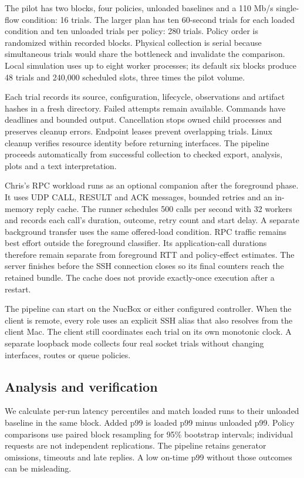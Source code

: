 The pilot has two blocks, four policies, unloaded baselines and a 110 Mb/s
single-flow condition: 16 trials. The larger plan has ten 60-second trials
for each loaded condition and ten unloaded trials per policy: 280 trials.
Policy order is randomized within recorded blocks. Physical collection is
serial because simultaneous trials would share the bottleneck and invalidate
the comparison. Local simulation uses up to eight worker processes; its
default six blocks produce 48 trials and 240,000 scheduled slots, three times
the pilot volume.

Each trial records its source, configuration, lifecycle, observations and
artifact hashes in a fresh directory. Failed attempts remain available.
Commands have deadlines and bounded output. Cancellation stops owned child
processes and preserves cleanup errors. Endpoint leases prevent overlapping
trials. Linux cleanup verifies resource identity before returning interfaces.
The pipeline proceeds automatically from successful collection to checked
export, analysis, plots and a text interpretation.

Chris's RPC workload runs as an optional companion after the foreground phase.
It uses UDP CALL, RESULT and ACK messages, bounded retries and an in-memory
reply cache. The runner schedules 500 calls per second with 32 workers and
records each call's duration, outcome, retry count and start delay. A separate
background transfer uses the same offered-load condition. RPC traffic remains
best effort outside the foreground classifier. Its application-call durations
therefore remain separate from foreground RTT and policy-effect estimates.
The server finishes before the SSH connection closes so its final counters
reach the retained bundle. The cache does not provide exactly-once execution
after a restart.

The pipeline can start on the NucBox or either configured controller. When
the client is remote, every role uses an explicit SSH alias that also resolves
from the client Mac. The client still coordinates each trial on its own
monotonic clock. A separate loopback mode collects four real socket trials
without changing interfaces, routes or queue policies.

\subsection{Analysis and verification}
We calculate per-run latency percentiles and match loaded runs to their
unloaded baseline in the same block. Added p99 is loaded p99 minus unloaded
p99. Policy comparisons use paired block resampling for 95\% bootstrap
intervals; individual requests are not independent replications. The pipeline
retains generator omissions, timeouts and late replies. A low on-time p99
without those outcomes can be misleading.

